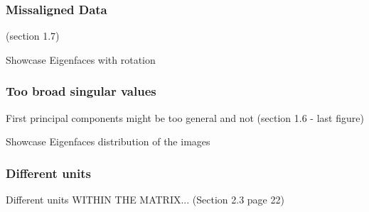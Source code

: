 \subsubsection{Missaligned Data}

\cite{brunton2019data} (section 1.7)

Showcase Eigenfaces with rotation

\clearpage




\subsubsection{Too broad singular values}

First principal components might be too general and not \cite{brunton2019data} (section 1.6 - last figure)

Showcase Eigenfaces distribution of the images

\clearpage


\subsubsection{Different units}

Different units WITHIN THE MATRIX... \cite{Jolliffe2002book} (Section 2.3 page 22)

\clearpage
